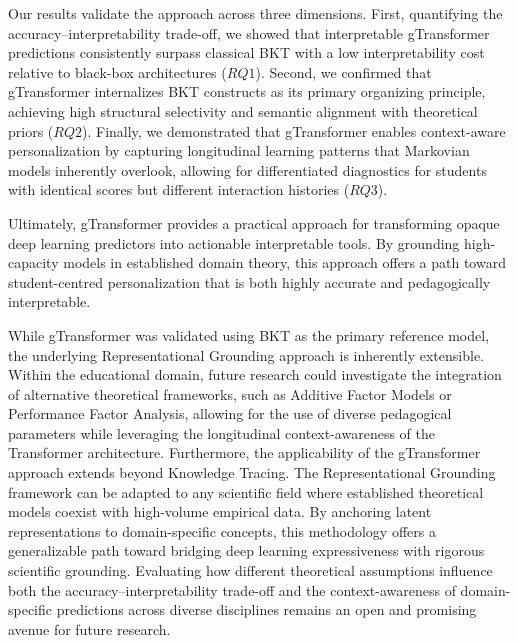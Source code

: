 \documentclass[applsci,article,submit,moreauthors,pdftex]{Definitions/mdpi}
\begin{document}
Our results validate the approach across three dimensions. First, quantifying the accuracy--interpretability trade-off, we showed that interpretable gTransformer predictions consistently surpass classical BKT with a low interpretability cost relative to black-box architectures ($RQ1$). Second, we confirmed that gTransformer internalizes BKT constructs as its primary organizing principle, achieving high structural selectivity and semantic alignment with theoretical priors ($RQ2$). Finally, we demonstrated that gTransformer enables context-aware personalization by capturing longitudinal learning patterns that Markovian models inherently overlook, allowing for differentiated diagnostics for students with identical scores but different interaction histories ($RQ3$).

Ultimately, gTransformer provides a practical approach for transforming opaque deep learning predictors into actionable interpretable tools. By grounding high-capacity models in established domain theory, this approach offers a path toward student-centred personalization that is both highly accurate and pedagogically interpretable.

While gTransformer was validated using BKT as the primary reference model, the underlying Representational Grounding approach is inherently extensible. Within the educational domain, future research could investigate the integration of alternative theoretical frameworks, such as Additive Factor Models or Performance Factor Analysis, allowing for the use of diverse pedagogical parameters while leveraging the longitudinal context-awareness of the Transformer architecture. Furthermore, the applicability of the gTransformer approach extends beyond Knowledge Tracing. The Representational Grounding framework can be adapted to any scientific field where established theoretical models coexist with high-volume empirical data. By anchoring latent representations to domain-specific concepts, this methodology offers a generalizable path toward bridging deep learning expressiveness with rigorous scientific grounding. Evaluating how different theoretical assumptions influence both the accuracy--interpretability trade-off and the context-awareness of domain-specific predictions across diverse disciplines remains an open and promising avenue for future research.


\vspace{6pt} 

\end{document}
